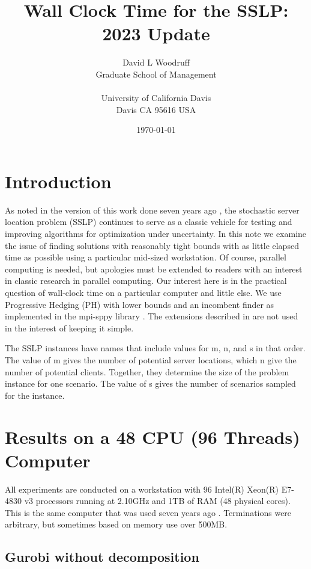 \documentclass{article}
\title{Wall Clock Time for the SSLP: 2023 Update}
\author{  David L Woodruff\\
  Graduate School of Management\\
  \\
  University of California Davis\\
  Davis CA 95616 USA}
\date{\today}
\begin{document}
\maketitle


\section{Introduction}

As noted in the version of this work done seven years ago \cite{sslpfortime}, the stochastic server location problem (SSLP) \cite{sslp} continues to serve as a classic vehicle
for testing and improving algorithms for optimization under uncertainty. In this note we
examine the issue of finding solutions with reasonably tight bounds with as little elapsed
time as possible using a particular mid-sized workstation. Of course, parallel computing is needed, but apologies must be extended
to readers with an interest in classic research in parallel computing. Our interest here is
in the practical question of wall-clock time on a particular computer and little else.
We use Progressive Hedging (PH) \cite{ph} with lower bounds \cite{gadeetal16} 
and an incombent finder as implemented in the mpi-sppy library \cite{mpi-sppy}.
 The extensions described in \cite{WW} are not used in the interest of keeping it simple.

The SSLP instances have names that include values for m, n, and s in that order. The value
of m gives the number of potential server locations, which n give the number of potential
clients. Together, they determine the size of the problem instance for one scenario. The
value of s gives the number of scenarios sampled for the instance.

\section{Results on a 48 CPU (96 Threads) Computer}

All experiments are conducted on a workstation with 96 Intel(R) Xeon(R) E7-4830 v3 processors running at 2.10GHz
and 1TB of RAM (48 physical cores).  This is the same computer that was used seven years ago \cite{sslpfortime}.  Terminations were arbitrary, but sometimes based on memory use over 500MB.

\subsection{Gurobi without decomposition}
\end{document}
